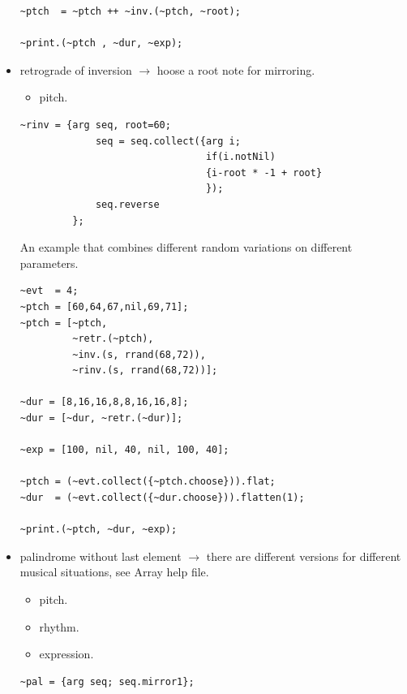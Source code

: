 \begin{itemize}
\begin{lstlisting}
~ptch  = ~ptch ++ ~inv.(~ptch, ~root);

~print.(~ptch , ~dur, ~exp);
\end{lstlisting}

\item retrograde of inversion \(\rightarrow\) hoose a root note for mirroring.
    \begin{itemize}
    \tightlist
    \item pitch.
    \end{itemize}

\begin{lstlisting}[frame=single, caption=retrograde of inversion function] 
~rinv = {arg seq, root=60;
             seq = seq.collect({arg i;
                                if(i.notNil)
                                {i-root * -1 + root} 
                                });
             seq.reverse
	     };
\end{lstlisting}

An example that combines different random variations on different parameters.

\begin{lstlisting}
~evt  = 4;        
~ptch = [60,64,67,nil,69,71];
~ptch = [~ptch,                     
         ~retr.(~ptch),
         ~inv.(s, rrand(68,72)),
         ~rinv.(s, rrand(68,72))];
         
~dur = [8,16,16,8,8,16,16,8];
~dur = [~dur, ~retr.(~dur)];

~exp = [100, nil, 40, nil, 100, 40];

~ptch = (~evt.collect({~ptch.choose})).flat;   
~dur  = (~evt.collect({~dur.choose})).flatten(1);

~print.(~ptch, ~dur, ~exp);
\end{lstlisting}

\item palindrome without last element \(\rightarrow\) there are different versions for different musical situations, see Array help file.
    \begin{itemize}
    \tightlist
    \item pitch.
    \item rhythm.
    \item expression.
    \end{itemize}

\begin{lstlisting}[frame=single, caption=palindrome function] 
~pal = {arg seq; seq.mirror1};
\end{lstlisting}


\end{itemize}
